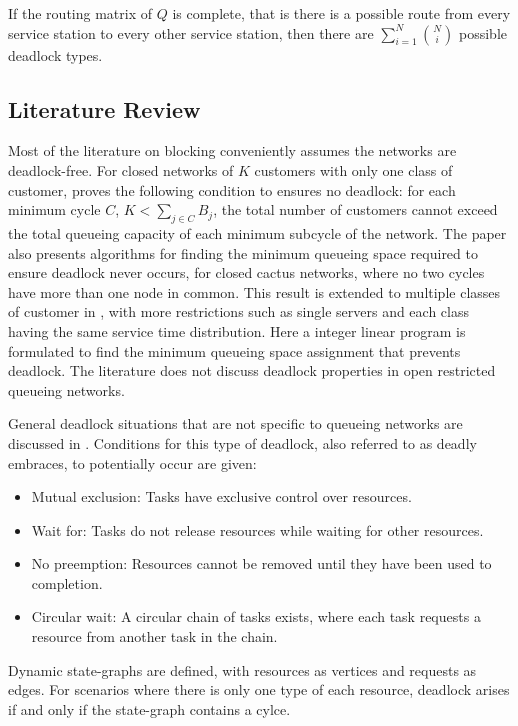 \documentclass{article}
\begin{document}
If the routing matrix of $Q$ is complete, that is there is a possible route from every service station to every other service station, then there are $\sum_{i=1}^N \binom{N}{i}$ possible deadlock types.

\subsection{Literature Review}

Most of the literature on blocking conveniently assumes the networks are
deadlock-free. %
For closed networks of $K$ customers with only one class of customer, \cite{kunduakyildiz89} proves the following condition to ensures no deadlock: for each minimum cycle $C$, $K < \sum_{j\in C} B_j$, the total number of customers cannot exceed the total queueing capacity of each minimum subcycle of the network.
The paper also presents algorithms for finding the minimum queueing space required to ensure deadlock never occurs, for closed cactus networks, where no two cycles have more than one node in common.
This result is extended to multiple classes of customer in \cite{liebeherrakyildiz95}, with more restrictions such as single servers and each class having the same service time distribution.
Here a integer linear program is formulated to find the minimum queueing space assignment that prevents deadlock.
The literature does not discuss deadlock properties in open restricted queueing networks.

General deadlock situations that are not specific to queueing networks are discussed in \cite{coffmanelphick71}.
Conditions for this type of deadlock, also referred to as deadly embraces, to potentially occur are given:
\begin{itemize}
  \item Mutual exclusion: Tasks have exclusive control over resources.
  \item Wait for: Tasks do not release resources while waiting for other resources.
  \item No preemption: Resources cannot be removed until they have been used to completion.
  \item Circular wait: A circular chain of tasks exists, where each task requests a resource from another task in the chain.
\end{itemize}
Dynamic state-graphs are defined, with resources as vertices and requests as edges.
For scenarios where there is only one type of each resource, deadlock arises if and only if the state-graph contains a cylce.
\end{document}
